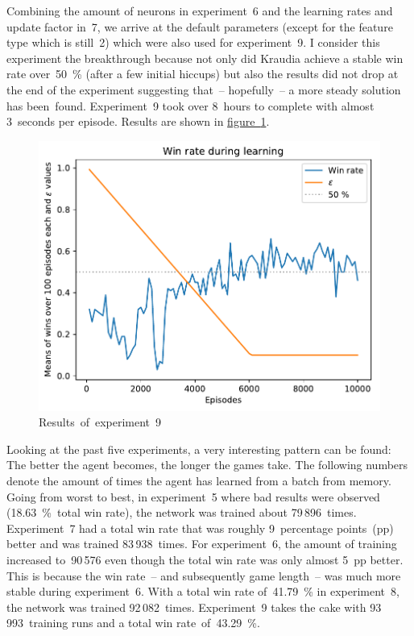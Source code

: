 \documentclass[a4paper,titlepage]{article}
\begin{document}
Combining the amount of neurons in experiment~6 and the learning rates and update factor in~7, we arrive at the default parameters (except for the feature type which is still~2) which were also used for experiment~9. I consider this experiment the breakthrough because not only did Kraudia achieve a stable win rate over~50~\% (after a few initial hiccups) but also the results did not drop at the end of the experiment suggesting that~-- hopefully~-- a more steady solution has been~found. Experiment~9 took over 8~hours to complete with almost 3~seconds per episode. Results are shown in \hyperref[fig:exp9]{figure~\ref*{fig:exp9}}.
\begin{figure}
  \centering
  \includegraphics[width=\textwidth]{../experiments/exp9/win_stats.pdf}
  \caption{Results~of~experiment~9}
  \label{fig:exp9}
\end{figure}
\medskip

Looking at the past five experiments, a very interesting pattern can be found: The better the agent becomes, the longer the games take. The following numbers denote the amount of times the agent has learned from a batch from memory. Going from worst to best, in experiment~5 where bad results were observed (18.63~\%~total win rate), the network was trained about 79\,896~times. Experiment~7 had a total win rate that was roughly 9~percentage points~(pp) better and was trained 83\,938~times. For experiment~6, the amount of training increased to~90\,576 even though the total win rate was only almost 5~pp better. This is because the win rate~-- and subsequently game length~-- was much more stable during experiment~6. With a total win rate of~41.79~\% in experiment~8, the network was trained 92\,082~times. Experiment~9 takes the cake with 93\,993~training runs and a total win rate~of~43.29~\%.
\end{document}
